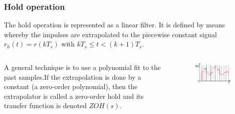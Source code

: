 \begin{frame}
	\frametitle{Hold operation}
	\begin{block}{}
	The hold operation is represented as a linear filter. It is defined by means whereby the impulses are extrapolated to the piecewise constant signal $r_h(t) = r(kT_s)$ with $kT_s \leq t < (k+1)T_s$.\\
	\end{block}
	\vspace{1em}
	\begin{columns}
		\begin{column}{0.5\textwidth}
		A general technique is to use a polynomial fit to the past samples.If the extrapolation is done by a constant (a zero-order polynomial), then the extrapolator is called a zero-order hold and its transfer function is denoted $ZOH(s)$. 
		\end{column}
		\begin{column}{0.5\textwidth}
		\begin{figure}
			\includegraphics[width=1\linewidth]{sample_and_hold}
		\end{figure}	
		\end{column}	
	\end{columns}
\end{frame}

